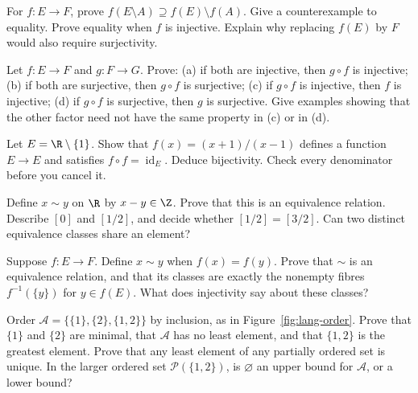 \begin{exercise}[$\star\star$]\label{ex:lang-complement}
For $f:E\to F$, prove $f(E\setminus A)\supseteq f(E)\setminus f(A)$. Give a counterexample to equality. Prove equality when $f$ is injective. Explain why replacing $f(E)$ by $F$ would also require surjectivity.
\end{exercise}

\begin{exercise}[$\star\star$]\label{ex:lang-composition}
Let $f:E\to F$ and $g:F\to G$. Prove:
(a) if both are injective, then $g\circ f$ is injective;
(b) if both are surjective, then $g\circ f$ is surjective;
(c) if $g\circ f$ is injective, then $f$ is injective;
(d) if $g\circ f$ is surjective, then $g$ is surjective.
Give examples showing that the other factor need not have the same property in (c) or in (d).
\end{exercise}

\begin{exercise}[$\star\star$]\label{ex:lang-selfinverse}
Let $E=\R\setminus\{1\}$. Show that $f(x)=(x+1)/(x-1)$ defines a function $E\to E$ and satisfies $f\circ f=\operatorname{id}_E$. Deduce bijectivity. Check every denominator before you cancel it.
\end{exercise}

\begin{exercise}[$\star\star$]\label{ex:lang-equivalence}
Define $x\sim y$ on $\R$ by $x-y\in\Z$. Prove that this is an equivalence relation. Describe $[0]$ and $[1/2]$, and decide whether $[1/2]=[3/2]$. Can two distinct equivalence classes share an element?
\end{exercise}

\begin{exercise}[$\star\star$]\label{ex:lang-partitions}
Suppose $f:E\to F$. Define $x\sim y$ when $f(x)=f(y)$. Prove that $\sim$ is an equivalence relation, and that its classes are exactly the nonempty fibres $f^{-1}(\{y\})$ for $y\in f(E)$. What does injectivity say about these classes?
\end{exercise}

\begin{exercise}[$\star\star$]\label{ex:lang-order}
Order $\mathcal A=\{\{1\},\{2\},\{1,2\}\}$ by inclusion, as in Figure~\ref{fig:lang-order}. Prove that $\{1\}$ and $\{2\}$ are minimal, that $\mathcal A$ has no least element, and that $\{1,2\}$ is the greatest element. Prove that any least element of any partially ordered set is unique. In the larger ordered set $\mathcal P(\{1,2\})$, is $\varnothing$ an upper bound for $\mathcal A$, or a lower bound?
\end{exercise}

